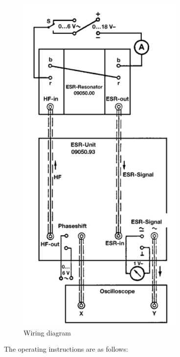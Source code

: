 \documentclass[%
 reprint,
nofootinbib,
 amsmath,amssymb,
 aps,
floatfix,
]{revtex4-2}
\begin{document}
    \begin{figure}
        \centering
        \includegraphics{Figures/wiringdg.png}
        \caption{Wiring diagram}
        \label{fig:wiring}
    \end{figure}
    \par
    The operating instructions are as follows:
\end{document}
